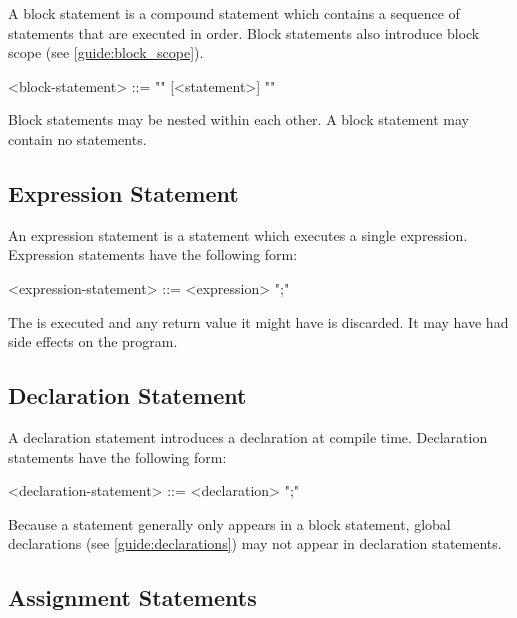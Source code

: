 A block statement is a compound statement which contains a sequence of statements that are executed in order. Block statements also introduce block scope (see \ref{guide:block_scope}).

\begin{minip}
\begin{grammar}
<block-statement> ::=
"{" [<statement>] "}"
\end{grammar}
\end{minip}

Block statements may be nested within each other. A block statement may contain no statements. 

\subsection{Expression Statement} \label{guide:expr_stmt}

An expression statement is a statement which executes a single expression. Expression statements have the following form:

\begin{minip}
\begin{grammar}
<expression-statement> ::=
<expression> ";"
\end{grammar}
\end{minip}

The  is executed and any return value it might have is discarded. It may have had side effects on the program.

\subsection{Declaration Statement} \label{guide:decl_stmt}

A declaration statement introduces a declaration at compile time. Declaration statements have the following form:

\begin{minip}
\begin{grammar}
<declaration-statement> ::=
<declaration> ";"
\end{grammar}
\end{minip}

Because a statement generally only appears in a block statement, global declarations (see \ref{guide:declarations}) may not appear in declaration statements. 

\subsection{Assignment Statements} \label{guide:assign_stmt}

